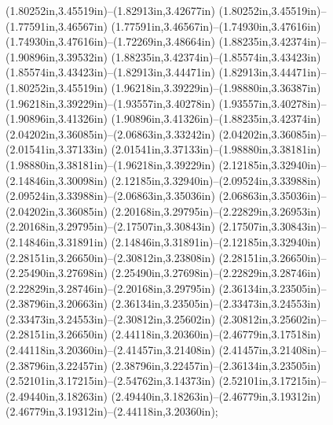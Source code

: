 (1.80252in,3.45519in)--(1.82913in,3.42677in) (1.80252in,3.45519in)--(1.77591in,3.46567in) (1.77591in,3.46567in)--(1.74930in,3.47616in) (1.74930in,3.47616in)--(1.72269in,3.48664in) (1.88235in,3.42374in)--(1.90896in,3.39532in) (1.88235in,3.42374in)--(1.85574in,3.43423in) (1.85574in,3.43423in)--(1.82913in,3.44471in) (1.82913in,3.44471in)--(1.80252in,3.45519in) (1.96218in,3.39229in)--(1.98880in,3.36387in) (1.96218in,3.39229in)--(1.93557in,3.40278in) (1.93557in,3.40278in)--(1.90896in,3.41326in) (1.90896in,3.41326in)--(1.88235in,3.42374in) (2.04202in,3.36085in)--(2.06863in,3.33242in) (2.04202in,3.36085in)--(2.01541in,3.37133in) (2.01541in,3.37133in)--(1.98880in,3.38181in) (1.98880in,3.38181in)--(1.96218in,3.39229in) (2.12185in,3.32940in)--(2.14846in,3.30098in) (2.12185in,3.32940in)--(2.09524in,3.33988in) (2.09524in,3.33988in)--(2.06863in,3.35036in) (2.06863in,3.35036in)--(2.04202in,3.36085in) (2.20168in,3.29795in)--(2.22829in,3.26953in) (2.20168in,3.29795in)--(2.17507in,3.30843in) (2.17507in,3.30843in)--(2.14846in,3.31891in) (2.14846in,3.31891in)--(2.12185in,3.32940in) (2.28151in,3.26650in)--(2.30812in,3.23808in) (2.28151in,3.26650in)--(2.25490in,3.27698in) (2.25490in,3.27698in)--(2.22829in,3.28746in) (2.22829in,3.28746in)--(2.20168in,3.29795in) (2.36134in,3.23505in)--(2.38796in,3.20663in) (2.36134in,3.23505in)--(2.33473in,3.24553in) (2.33473in,3.24553in)--(2.30812in,3.25602in) (2.30812in,3.25602in)--(2.28151in,3.26650in) (2.44118in,3.20360in)--(2.46779in,3.17518in) (2.44118in,3.20360in)--(2.41457in,3.21408in) (2.41457in,3.21408in)--(2.38796in,3.22457in) (2.38796in,3.22457in)--(2.36134in,3.23505in) (2.52101in,3.17215in)--(2.54762in,3.14373in) (2.52101in,3.17215in)--(2.49440in,3.18263in) (2.49440in,3.18263in)--(2.46779in,3.19312in) (2.46779in,3.19312in)--(2.44118in,3.20360in);
